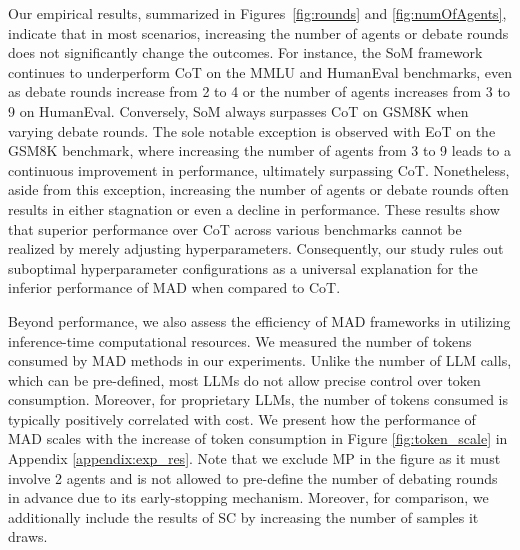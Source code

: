 Our empirical results, summarized in Figures~\ref{fig:rounds} and \ref{fig:numOfAgents}, indicate that 
in most scenarios, increasing the number of agents or debate rounds does not significantly change the outcomes. For instance, the SoM framework continues to underperform CoT on the MMLU and HumanEval benchmarks, even as debate rounds increase from 2 to 4 or the number of agents increases from 3 to 9 on HumanEval. Conversely, SoM always surpasses CoT on GSM8K when varying debate rounds. The sole notable exception is observed with EoT on the GSM8K benchmark, where increasing the number of agents from 3 to 9 leads to a continuous improvement in performance, ultimately surpassing CoT. Nonetheless, aside from this exception, increasing the number of agents or debate rounds often results in either stagnation or even a decline in performance. These results show that superior performance over CoT across various benchmarks cannot be realized by merely adjusting hyperparameters. Consequently, our study rules out suboptimal hyperparameter configurations as a universal explanation for the inferior performance of MAD when compared to CoT.



 Beyond performance, we also assess the efficiency of MAD frameworks in utilizing inference-time computational resources. We measured the number of tokens consumed by MAD methods in our experiments. Unlike the number of LLM calls, which can be pre-defined, most LLMs do not allow precise control over token consumption. Moreover, for proprietary LLMs, the number of tokens consumed is typically positively correlated with cost. 
We present how the performance of MAD scales with the increase of token consumption in Figure \ref{fig:token_scale} in Appendix \ref{appendix:exp_res}. 
Note that we exclude MP in the figure as it must involve 2 agents and is not allowed to pre-define the number of debating rounds in advance due to its early-stopping mechanism. 
Moreover, for comparison, we additionally include the results of SC by increasing the number of samples it draws.

